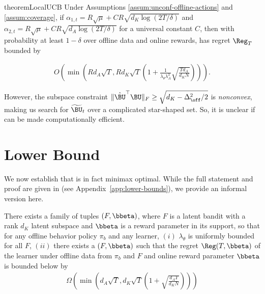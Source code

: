 \begin{restatable}{theorem}{LocalUCB}\label{thm:local-ucb}
    Under Assumptions \ref{assum:unconf-offline-actions} and \ref{assum:coverage}, if $\alpha_{1,t} = R\sqrt{\mu} + CR\sqrt{d_K\log(2T/\delta)}$ and $\alpha_{2,t} = R\sqrt{\mu} + CR\sqrt{d_A\log(2T/\delta)}$ for a universal constant $C$, then with probability at least $1-\delta$ over offline data and online rewards,  has regret $\Reg_T$ bounded by
 
    \begin{align*}
        O\textstyle{\left(\min\left(Rd_A\sqrt{T}, Rd_K\sqrt{T}\left(1 + \frac{1}{\lambda_\theta\lambda_A^3}\sqrt{\frac{Td_A}{d_KN}}\right)\right)\right)}.
    \end{align*}
 
\end{restatable}
However, the subspace constraint $\|\hat \BU^\top \BU\|_F \geq \sqrt{d_K - \Delta_{\off}^2/2}$ is \textit{nonconvex}, making us search for $\widetilde{\BU}_t$ over a complicated star-shaped set. So, it is unclear if  can be made computationally efficient.

\section{Lower Bound}

We now establish that  is in fact minimax optimal. While the full statement and proof are given in \citet{kausik2024leveraging} (see Appendix~\ref{app:lower-bounds}), we provide an informal version here.

\begin{theorem}\label{thm:lower-bound}
    There exists a family of tuples $(F, \bbeta)$, where $F$ is a latent bandit with a rank $d_K$ latent subspace and $\bbeta$ is a reward parameter in its support, so that for any offline behavior policy $\pi_b$ and any learner, $(i)$ $\lambda_\theta$ is uniformly bounded for all $F$, $(ii)$ there exists a $(F, \bbeta)$ such that the regret $\Reg(T, \bbeta)$ of the learner under offline data from $\pi_b$ and $F$ and online reward parameter $\bbeta$ is bounded below by
    \begin{align*}
        \Omega\left(\min\left(d_A\sqrt{T}, d_K\sqrt{T}\left(1 + \sqrt{\frac{d_AT}{d_KN}} \right)\right)\right)
    \end{align*}
\end{theorem}

